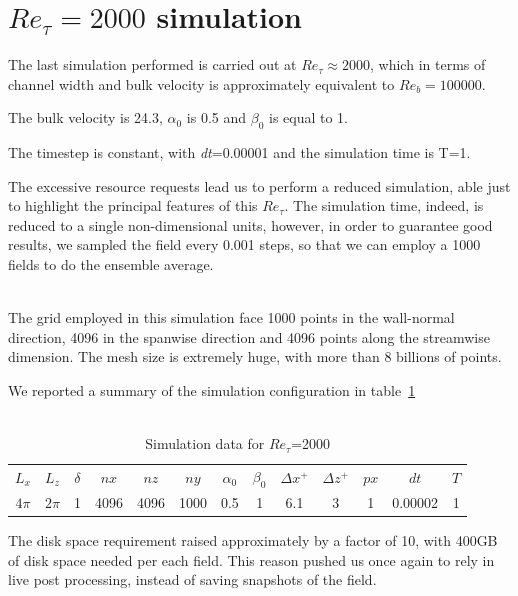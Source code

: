 \section{$Re_{\tau}=2000$ simulation} 
The last simulation performed is carried out at $Re_{\tau}\approx2000$, which in terms of channel width and bulk velocity is approximately equivalent to $Re_{b}=100000$.\par
The bulk velocity is 24.3, $\alpha_{0}$ is 0.5 and $\beta_{0}$ is equal to 1.\par
The timestep is constant, with \emph{dt}=0.00001 and the simulation time is T=1. \par
The excessive resource requests lead us to perform a reduced simulation, able just to highlight the principal features of this $Re_{\tau}$. The simulation time, indeed, is reduced to a single non-dimensional units, however, in order to guarantee good results, we sampled the field every 0.001 steps, so that we can employ a 1000 fields to do the ensemble average.\\~\par
The grid employed in this simulation face 1000 points in the wall-normal direction, 4096 in the spanwise direction and 4096 points along the streamwise dimension. The mesh size is extremely huge, with more than 8 billions of points.\par
We reported a summary of the simulation configuration in table~\ref{table:2000}\\~\par

\begin{table}
\caption{Simulation data for $Re_{\tau}$=2000}
\begin{center}
\begin{tabular}{ccccccccccccc}
\toprule
$L_{x}$ & $L_{z}$ & $\delta$ & $nx$ & $nz$ & $ny$ & $\alpha_{0}$ & $\beta_{0}$ & $\Delta x^{+}$ & $\Delta z^{+}$ & $px$ & $dt$ & $T$\\
$4\pi$ & $2\pi$ & 1 & 4096 & 4096 & 1000 & 0.5 & 1 & 6.1  & 3 & 1 & 0.00002 & 1 \\
\bottomrule
\end{tabular}
\end{center}
\label{table:2000}
\end{table}


The disk space requirement raised approximately by a factor of 10, with 400GB of disk space needed per each field. This reason pushed us once again to rely in live post processing, instead of saving snapshots of the field.\\~\par

